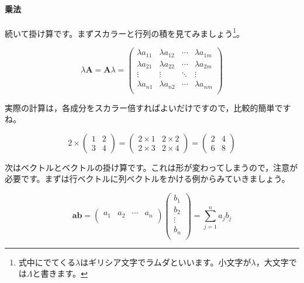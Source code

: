 \documentclass{ltjsbook}
\begin{document}
\paragraph{乗法}
続いて掛け算です。まずスカラーと行列の積を見てみましょう\footnote{式中にでてくる$\lambda$はギリシア文字でラムダといいます。小文字が$\lambda$，大文字では$\Lambda$と書きます。}。

\begin{equation*}
	\lambda \bm{A} = \bm{A} \lambda =
	\begin{pmatrix}
		\lambda a_{11} & \lambda a_{12} & \cdots & \lambda a_{1m} \\
		\lambda a_{21} & \lambda a_{22} & \cdots & \lambda a_{2m} \\
		\vdots         & \vdots         & \ddots & \vdots         \\
		\lambda a_{n1} & \lambda a_{n2} & \cdots & \lambda a_{nm} \\
	\end{pmatrix}
\end{equation*}


実際の計算は，各成分をスカラー倍すればよいだけですので，比較的簡単ですね。

\begin{equation*}
	2 \times
	\begin{pmatrix}
		1 & 2 \\
		3 & 4
	\end{pmatrix}
	=
	\begin{pmatrix}
		2 \times 1 & 2 \times 2 \\
		2 \times 3 & 2 \times 4
	\end{pmatrix}
	=
	\begin{pmatrix}
		2 & 4 \\
		6 & 8
	\end{pmatrix}
\end{equation*}


次はベクトルとベクトルの掛け算です。これは形が変わってしまうので，注意が必要です。まずは行ベクトルに列ベクトルをかける例からみていきましょう。

\begin{equation*}
	\bm{a} \bm{b} =
	\begin{pmatrix}
		a_1 & a_2 & \cdots & a_n \\
	\end{pmatrix}
	\begin{pmatrix}
		b_1    \\
		b_2    \\
		\vdots \\
		b_n    \\
	\end{pmatrix}
	=
	\sum_{j=1}^{n} a_{j} b_{j}
\end{equation*}
\end{document}
